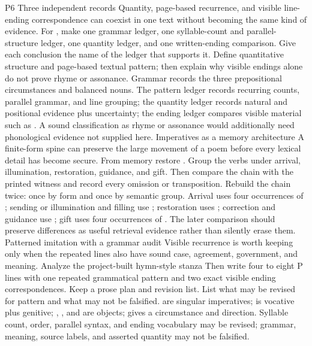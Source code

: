 \begin{courseunit}{P6}
\SubmoduleExtension
  {Three independent records}
  {Quantity, page-based recurrence, and visible line-ending
  correspondence can coexist in one text without becoming the same kind of
  evidence.}
  {For , make
  one grammar ledger, one syllable-count and parallel-structure ledger, one
  quantity ledger, and one written-ending comparison. Give each conclusion
  the name of the ledger that supports it.}
  {Define quantitative structure and page-based textual pattern; then explain
  why visible endings alone do not prove rhyme or assonance.}
  {Grammar records the three prepositional circumstances and balanced nouns.
  The pattern ledger records recurring counts, parallel grammar, and line
  grouping; the quantity ledger records natural and positional evidence plus
  uncertainty; the ending ledger compares visible material such as
  . A sound classification as rhyme or
  assonance would additionally need phonological evidence not supplied here.}
\SubmoduleExtension
  {Imperatives as a memory architecture}
  {A finite-form spine can preserve the large movement of a poem before every
  lexical detail has become secure.}
  {From memory restore . Group the
  verbs under arrival, illumination, restoration, guidance, and gift. Then
  compare the chain with the printed witness and record every omission or
  transposition.}
  {Rebuild the chain twice: once by form and once by semantic group.}
  {Arrival uses four occurrences of ; sending or illumination and
  filling use ; restoration uses ; correction and guidance use ; gift uses
  four occurrences of . The later comparison should preserve
  differences as useful retrieval evidence rather than silently erase them.}
\SubmoduleExtension
  {Patterned imitation with a grammar audit}
  {Visible recurrence is worth keeping only when the repeated lines also have
  sound case, agreement, government, and meaning.}
  {Analyze the project-built hymn-style stanza  Then
  write four to eight P lines with one repeated grammatical pattern and two
  exact visible ending correspondences. Keep a prose plan and revision list.}
  {List what may be revised for pattern and what may not be falsified.}
  { are singular imperatives;
   is vocative plus genitive; ,
  , and  are objects;  gives a
  circumstance and  direction. Syllable count, order,
  parallel syntax, and ending vocabulary may be revised; grammar, meaning,
  source labels, and asserted quantity may not be falsified.}
\end{courseunit}

